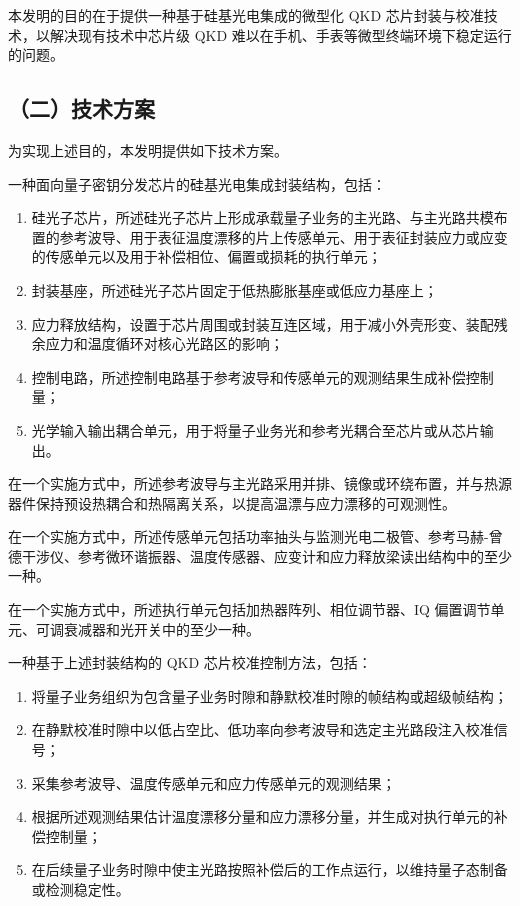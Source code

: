 \documentclass[12pt,a4paper]{article}
\begin{document}
本发明的目的在于提供一种基于硅基光电集成的微型化 QKD 芯片封装与校准技术，以解决现有技术中芯片级 QKD 难以在手机、手表等微型终端环境下稳定运行的问题。

\subsection*{（二）技术方案}

为实现上述目的，本发明提供如下技术方案。

一种面向量子密钥分发芯片的硅基光电集成封装结构，包括：
\begin{enumerate}[leftmargin=2em]
    \item 硅光子芯片，所述硅光子芯片上形成承载量子业务的主光路、与主光路共模布置的参考波导、用于表征温度漂移的片上传感单元、用于表征封装应力或应变的传感单元以及用于补偿相位、偏置或损耗的执行单元；
    \item 封装基座，所述硅光子芯片固定于低热膨胀基座或低应力基座上；
    \item 应力释放结构，设置于芯片周围或封装互连区域，用于减小外壳形变、装配残余应力和温度循环对核心光路区的影响；
    \item 控制电路，所述控制电路基于参考波导和传感单元的观测结果生成补偿控制量；
    \item 光学输入输出耦合单元，用于将量子业务光和参考光耦合至芯片或从芯片输出。
\end{enumerate}

在一个实施方式中，所述参考波导与主光路采用并排、镜像或环绕布置，并与热源器件保持预设热耦合和热隔离关系，以提高温漂与应力漂移的可观测性。

在一个实施方式中，所述传感单元包括功率抽头与监测光电二极管、参考马赫-曾德干涉仪、参考微环谐振器、温度传感器、应变计和应力释放梁读出结构中的至少一种。

在一个实施方式中，所述执行单元包括加热器阵列、相位调节器、IQ 偏置调节单元、可调衰减器和光开关中的至少一种。

一种基于上述封装结构的 QKD 芯片校准控制方法，包括：
\begin{enumerate}[leftmargin=2em]
    \item 将量子业务组织为包含量子业务时隙和静默校准时隙的帧结构或超级帧结构；
    \item 在静默校准时隙中以低占空比、低功率向参考波导和选定主光路段注入校准信号；
    \item 采集参考波导、温度传感单元和应力传感单元的观测结果；
    \item 根据所述观测结果估计温度漂移分量和应力漂移分量，并生成对执行单元的补偿控制量；
    \item 在后续量子业务时隙中使主光路按照补偿后的工作点运行，以维持量子态制备或检测稳定性。
\end{enumerate}
\end{document}
